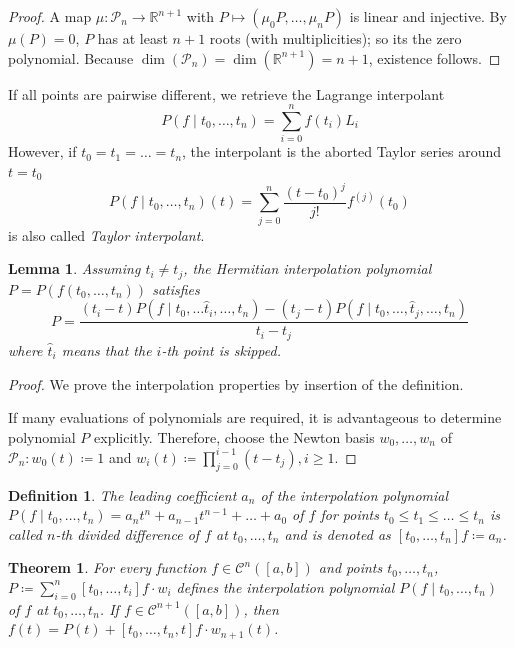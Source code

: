 \documentclass[a4paper]{article}
\newcounter{lecref}[section]
\numberwithin{lecref}{section}
\theoremstyle{break}
\newtheorem{thm}[lecref]{Theorem}
\newtheorem{definition}[lecref]{Definition}
\newtheorem{lemma}[lecref]{Lemma}
\begin{document}
\begin{proof}
  A map $\mu: \mathcal P_n \to \mathbb R^{n+1}$ with $P \mapsto (\mu_0 P, \dots, \mu_n P)$ is linear and injective.
  By $\mu(P) = 0$, $P$ has at least $n+1$ roots (with multiplicities); so its the zero polynomial.
  Because $\dim(\mathcal P_n) = \dim(\mathbb R^{n+1}) = n + 1$, existence follows.
\end{proof}

If all points are pairwise different, we retrieve the Lagrange interpolant
\[ P(f \mid t_0, \dots, t_n) = \sum_{i=0}^n f(t_i) L_i \]
However, if $t_0 = t_1 = \dots = t_n$, the interpolant is the aborted Taylor series around $t = t_0$
\[ P(f \mid t_0, \dots, t_n)(t) = \sum_{j=0}^n \frac{(t - t_0)^j}{j!} f^{(j)}(t_0) \]
is also called \emph{Taylor interpolant}.

\begin{lemma}
  \label{lemma:4-8}
  Assuming $t_i \neq t_j$, the Hermitian interpolation polynomial $P = P(f(t_0, \dots, t_n))$
  satisfies \[ P = \frac{(t_i - t) P(f \mid t_0, \dots \hat{t}_i, \dots, t_n) - (t_j - t) P(f \mid t_0, \dots, \hat t_j, \dots, t_n)}{t_i - t_j} \]
  where $\hat t_i$ means that the $i$-th point is skipped.
\end{lemma}

\begin{proof}
  We prove the interpolation properties by insertion of the definition.

  If many evaluations of polynomials are required, it is advantageous to determine polynomial $P$ explicitly.
  Therefore, choose the Newton basis $w_0, \dots, w_n$ of $\mathcal P_n: w_0(t) \coloneqq 1$ and $w_i(t) \coloneqq \prod_{j=0}^{i-1} (t - t_j), i \geq 1$.
\end{proof}

\begin{definition}
  \label{definition:4-9}
  The leading coefficient $a_n$ of the interpolation polynomial $P(f \mid t_0, \dots, t_n) = a_n t^n + a_{n-1} t^{n-1} + \dots + a_0$ of $f$ for points $t_0 \leq t_1 \leq \dots \leq t_n$ is called $n$-th \emph{divided difference} of $f$ at $t_0, \dots, t_n$ and is denoted as $[t_0, \dots, t_n] f \coloneqq a_n$. %
\end{definition}

\begin{thm}
  \label{theorem:4-10}
  For every function $f \in \mathcal C^n([a,b])$ and points $t_0, \dots, t_n$, $P \coloneqq \sum_{i=0}^n [t_0, \dots, t_i] f \cdot w_i$ defines the interpolation polynomial $P(f \mid t_0, \dots, t_n)$ of $f$ at $t_0, \dots, t_n$.
  If $f \in \mathcal C^{n+1}([a,b])$, then $f(t) = P(t) + [t_0, \dots, t_n, t] f \cdot w_{n+1}(t)$.
\end{thm}
\end{document}
